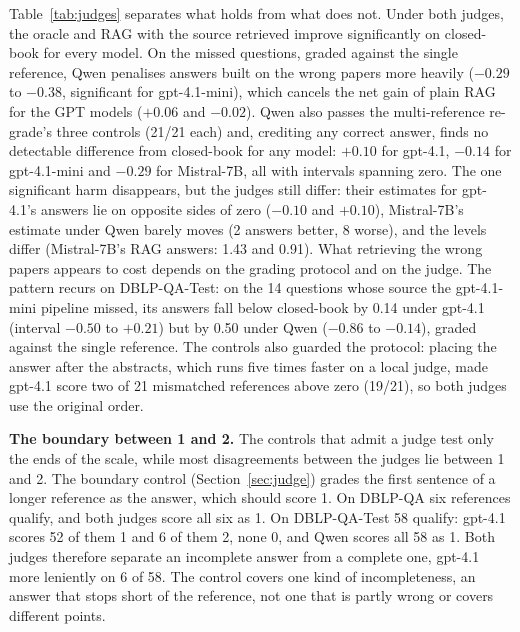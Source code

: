 \documentclass[conference]{IEEEtran}
\newcommand{\dq}{DBLP-QA}
\newcommand{\test}{DBLP-QA-Test}
\begin{document}
Table~\ref{tab:judges} separates what holds from what does not. Under both judges, the oracle and RAG with
the source retrieved improve significantly on closed-book for every model. On the missed questions,
graded against the single reference, Qwen penalises answers built on the wrong papers more heavily ($-0.29$
to $-0.38$, significant for gpt-4.1-mini), which cancels the net gain of plain RAG for the GPT models
($+0.06$ and $-0.02$). Qwen also passes the multi-reference re-grade's three controls (21/21 each) and,
crediting any correct answer, finds no detectable difference from closed-book for any model: $+0.10$ for
gpt-4.1, $-0.14$ for gpt-4.1-mini and $-0.29$ for Mistral-7B, all with intervals spanning zero. The one
significant harm disappears, but the judges still differ: their estimates for gpt-4.1's answers lie on
opposite sides of zero ($-0.10$ and $+0.10$), Mistral-7B's estimate under Qwen barely moves (2 answers
better, 8 worse), and the levels differ (Mistral-7B's RAG answers: 1.43 and 0.91). What retrieving the
wrong papers appears to cost depends on the grading protocol and on the judge. The pattern recurs on
\test{}: on the 14 questions whose source the gpt-4.1-mini pipeline missed, its answers fall below
closed-book by 0.14 under gpt-4.1 (interval $-0.50$ to $+0.21$) but by 0.50 under Qwen ($-0.86$ to
$-0.14$), graded against the single reference. The controls also guarded
the protocol: placing the answer after the abstracts, which runs five times faster on a local judge, made
gpt-4.1 score two of 21 mismatched references above zero (19/21), so both judges use the original order.

\textbf{The boundary between 1 and 2.} The controls that admit a judge test only the ends of the scale,
while most disagreements between the judges lie between 1 and 2. The boundary control
(Section~\ref{sec:judge}) grades the first sentence of a longer reference as the answer, which should
score 1. On \dq{} six references qualify, and both judges score all six as 1. On \test{} 58 qualify:
gpt-4.1 scores 52 of them 1 and 6 of them 2, none 0, and Qwen scores all 58 as 1. Both judges therefore
separate an incomplete answer from a complete one, gpt-4.1 more leniently on 6 of 58. The control covers
one kind of incompleteness, an answer that stops short of the reference, not one that is partly wrong or
covers different points.
\end{document}
